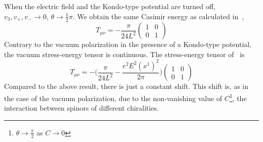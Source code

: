 \\\\
When the electric field and the Kondo-type potential are turned off, \ie $v_3, v_+, v_- \rightarrow 0$, $\theta \rightarrow \frac 1 2 \pi$.
We obtain the same Casimir energy as calculated in~\cite{Sundberg2003}, \ie
\begin{equation*}
T_{\mu\nu} = -\frac{\pi}{24L^2}\begin{pmatrix} 1 & 0 \\ 0 & 1\end{pmatrix}
\end{equation*}
%
Contrary to the vacuum polarization in the presence of a Kondo-type potential, 
the vacuum stress-energy tensor is continuous.
The stress-energy tensor of~\cite{Zahn2015} is
\begin{equation*}
T_{\mu\nu} = - \big( \frac{\pi}{24L^2} - \frac{e^2 E^2 (x^1)^2}{2\pi}\big) \begin{pmatrix} 1 & 0 \\ 0 & 1 \end{pmatrix}
\end{equation*}
Compared to the above result, there is just a constant shift.
This shift is, as in the case of the vacuum polarization, due to the non-vanishing value of $C$\footnote{
$\theta\rightarrow \frac \pi 2$ as $C\rightarrow 0$
}, 
\ie the interaction between spinors of different chiralities.
